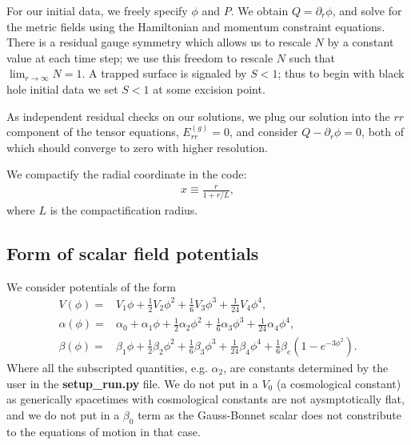 \documentclass[a4paper,11pt]{article}
\begin{document}
   For our initial data, we freely specify $\phi$ and $P$.
We obtain $Q=\partial_r\phi$, and solve for the metric fields using
the Hamiltonian and momentum constraint equations.
There is a residual gauge symmetry which allows us
to rescale $N$ by a constant value at each time step;
we use this freedom to rescale $N$ such
that $\lim_{r\to\infty}N=1$.
A trapped surface is signaled by $S<1$;
thus to begin with black hole initial data we set $S<1$ at some
excision point.

   As independent residual checks on our solutions, we plug our
solution into the $rr$ component of the tensor equations, $E^{(g)}_{rr}=0$,
and consider $Q-\partial_r\phi=0$, both of which should converge
to zero with higher resolution.

   We compactify the radial coordinate in the code:
\begin{align}
   x
   \equiv
   \frac{r}{1+r/L}
   ,
\end{align}
   where $L$ is the compactification radius.
\subsection{Form of scalar field potentials}
   We consider potentials of the form
\begin{subequations}
\begin{align}
   V\left(\phi\right)
   =&
   V_1\phi
+  \frac{1}{2}V_2\phi^2
+  \frac{1}{6}V_3\phi^3
+  \frac{1}{24}V_4\phi^4
   ,\\
   \alpha\left(\phi\right)
   =&
   \alpha_0
+  \alpha_1\phi
+  \frac{1}{2}\alpha_2\phi^2
+  \frac{1}{6}\alpha_3\phi^3
+  \frac{1}{24}\alpha_4\phi^4
   ,\\
   \beta\left(\phi\right)
   =&
   \beta_1\phi
+  \frac{1}{2}\beta_2\phi^2
+  \frac{1}{6}\beta_3\phi^3
+  \frac{1}{24}\beta_4\phi^4
+  \frac{1}{6}\beta_{e}\left(1-e^{-3\phi^2}\right)
   .
\end{align}
\end{subequations}
   Where all the subscripted quantities, e.g. $\alpha_2$, are constants
determined by the user in the {\bf setup\_run.py} file.
We do not put in a $V_0$ (a cosmological constant) as generically
spacetimes with cosmological constants are not aysmptotically flat,
and we do not put in a $\beta_0$ term as the Gauss-Bonnet scalar
does not constribute to the equations of motion in that case.






\end{document}
